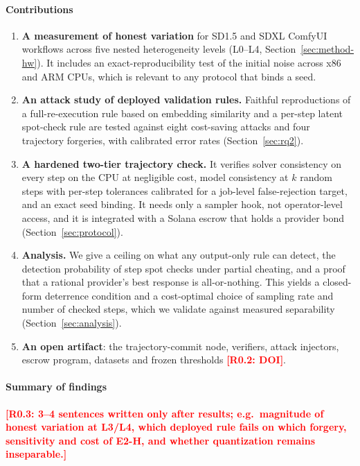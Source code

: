 \documentclass[preprint,review,12pt,authoryear]{elsarticle}
\newcommand{\res}[1]{\textcolor{red}{\textbf{[#1]}}}          %
\theoremstyle{definition}
\begin{document}
\paragraph{Contributions}
\begin{enumerate}
\item \textbf{A measurement of honest variation} for SD1.5 and SDXL ComfyUI workflows across five nested heterogeneity levels (L0--L4, Section~\ref{sec:method-hw}). It includes an exact-reproducibility test of the initial noise across x86 and ARM CPUs, which is relevant to any protocol that binds a seed.
\item \textbf{An attack study of deployed validation rules.} Faithful reproductions of a full-re-execution rule based on embedding similarity and a per-step latent spot-check rule are tested against eight cost-saving attacks and four trajectory forgeries, with calibrated error rates (Section~\ref{sec:rq2}).
\item \textbf{A hardened two-tier trajectory check.} It verifies solver consistency on every step on the CPU at negligible cost, model consistency at $k$ random steps with per-step tolerances calibrated for a job-level false-rejection target, and an exact seed binding. It needs only a sampler hook, not operator-level access, and it is integrated with a Solana escrow that holds a provider bond (Section~\ref{sec:protocol}).
\item \textbf{Analysis.} We give a ceiling on what any output-only rule can detect, the detection probability of step spot checks under partial cheating, and a proof that a rational provider's best response is all-or-nothing. This yields a closed-form deterrence condition and a cost-optimal choice of sampling rate and number of checked steps, which we validate against measured separability (Section~\ref{sec:analysis}).
\item \textbf{An open artifact}: the trajectory-commit node, verifiers, attack injectors, escrow program, datasets and frozen thresholds \res{R0.2: DOI}.
\end{enumerate}

\paragraph{Summary of findings} \res{R0.3: 3--4 sentences written only after results; e.g.\ magnitude of honest variation at L3/L4, which deployed rule fails on which forgery, sensitivity and cost of E2-H, and whether quantization remains inseparable.}
\end{document}
